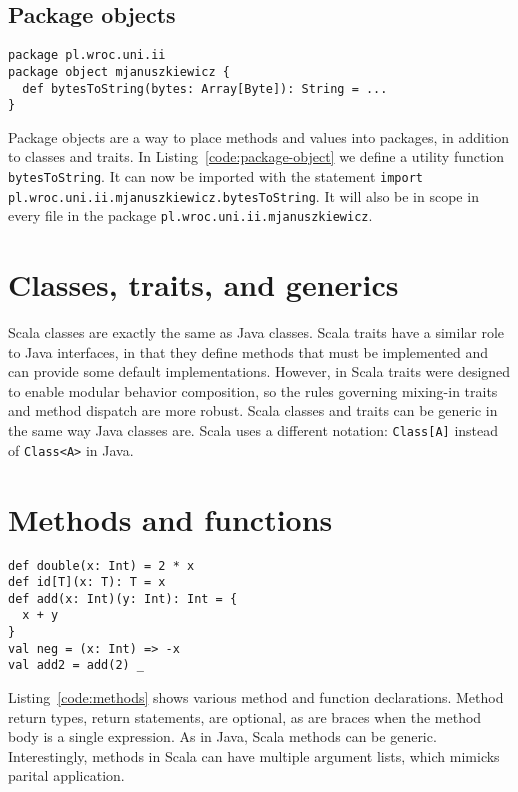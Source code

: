 \subsection{Package objects}

\begin{lstlisting}[caption=Package object, label=code:package-object, escapechar=|, float, floatplacement=H]
package pl.wroc.uni.ii
package object mjanuszkiewicz {
  def bytesToString(bytes: Array[Byte]): String = ...
}
\end{lstlisting}

Package objects are a way to place methods and values into packages, in addition to classes and traits.
In Listing~\ref{code:package-object} we define a utility function \texttt{bytesToString}.
It can now be imported with the statement \texttt{import pl.wroc.uni.ii.mjanuszkiewicz.bytesToString}.
It will also be in scope in every file in the package \texttt{pl.wroc.uni.ii.mjanuszkiewicz}.

\section{Classes, traits, and generics}

Scala classes are exactly the same as Java classes.
Scala traits have a similar role to Java interfaces, in that they define methods that must be implemented and can provide some default implementations.
However, in Scala traits were designed to enable modular behavior composition, so the rules governing mixing-in traits and method dispatch are more robust.
Scala classes and traits can be generic in the same way Java classes are.
Scala uses a different notation: \texttt{Class[A]} instead of \texttt{Class<A>} in Java.

\section{Methods and functions}

\begin{lstlisting}[caption=Methods and functions, label=code:methods, escapechar=|, float, floatplacement=H]
def double(x: Int) = 2 * x
def id[T](x: T): T = x
def add(x: Int)(y: Int): Int = {
  x + y
}
val neg = (x: Int) => -x
val add2 = add(2) _
\end{lstlisting}

Listing~\ref{code:methods} shows various method and function declarations.
Method return types, return statements, are optional, as are braces when the method body is a single expression.
As in Java, Scala methods can be generic.
Interestingly, methods in Scala can have multiple argument lists, which mimicks parital application.

